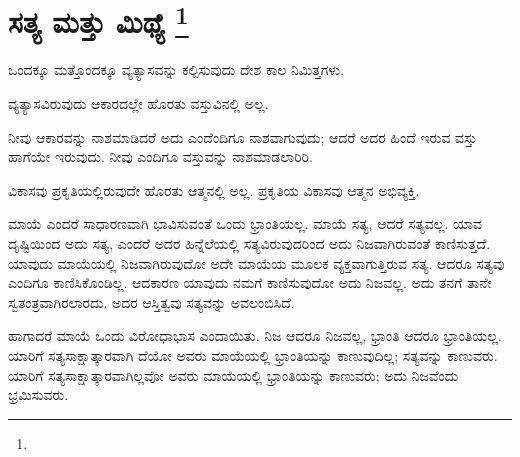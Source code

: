 
\chapter[ಸತ್ಯ ಮತ್ತು ಮಿಥ್ಯೆ ]{ಸತ್ಯ ಮತ್ತು ಮಿಥ್ಯೆ \protect\footnote{}}

ಒಂದಕ್ಕೂ ಮತ್ತೊಂದಕ್ಕೂ ವ್ಯತ್ಯಾಸವನ್ನು ಕಲ್ಪಿಸುವುದು ದೇಶ ಕಾಲ ನಿಮಿತ್ತಗಳು.

ವ್ಯತ್ಯಾಸವಿರುವುದು ಆಕಾರದಲ್ಲೇ ಹೊರತು ವಸ್ತುವಿನಲ್ಲಿ ಅಲ್ಲ.

ನೀವು ಆಕಾರವನ್ನು ನಾಶಮಾಡಿದರೆ ಅದು ಎಂದೆಂದಿಗೂ ನಾಶವಾಗುವುದು; ಆದರೆ ಅದರ ಹಿಂದೆ ಇರುವ ವಸ್ತು ಹಾಗೆಯೇ ಇರುವುದು. ನೀವು ಎಂದಿಗೂ ವಸ್ತುವನ್ನು ನಾಶಮಾಡಲಾರಿರಿ.

ವಿಕಾಸವು ಪ್ರಕೃತಿಯಲ್ಲಿರುವುದೇ ಹೊರತು ಆತ್ಮನಲ್ಲಿ ಅಲ್ಲ. ಪ್ರಕೃತಿಯ ವಿಕಾಸವು ಆತ್ಮನ ಅಭಿವ್ಯಕ್ತಿ.

ಮಾಯೆ ಎಂದರೆ ಸಾಧಾರಣವಾಗಿ ಭಾವಿಸುವಂತೆ ಒಂದು ಭ್ರಾಂತಿಯಲ್ಲ. ಮಾಯೆ ಸತ್ಯ, ಆದರೆ ಸತ್ಯವಲ್ಲ. ಯಾವ ದೃಷ್ಟಿಯಿಂದ ಅದು ಸತ್ಯ, ಎಂದರೆ ಅದರ ಹಿನ್ನೆಲೆಯಲ್ಲಿ ಸತ್ಯವಿರುವುದರಿಂದ ಅದು ನಿಜವಾಗಿರುವಂತೆ ಕಾಣಿಸುತ್ತದೆ. ಯಾವುದು ಮಾಯೆಯಲ್ಲಿ ನಿಜವಾಗಿರುವುದೋ ಅದೇ ಮಾಯೆಯ ಮೂಲಕ ವ್ಯಕ್ತವಾಗುತ್ತಿರುವ ಸತ್ಯ. ಆದರೂ ಸತ್ಯವು ಎಂದಿಗೂ ಕಾಣಿಸಿಕೊಂಡಿಲ್ಲ. ಆದಕಾರಣ ಯಾವುದು ನಮಗೆ ಕಾಣಿಸುವುದೋ ಅದು ನಿಜವಲ್ಲ. ಅದು ತನಗೆ ತಾನೇ ಸ್ವತಂತ್ರವಾಗಿರಲಾರದು. ಅದರ ಆಸ್ತಿತ್ವವು ಸತ್ಯವನ್ನು ಅವಲಂಬಿಸಿದೆ.

ಹಾಗಾದರೆ ಮಾಯೆ ಒಂದು ವಿರೋಧಾಭಾಸ ಎಂದಾಯಿತು. ನಿಜ ಆದರೂ ನಿಜವಲ್ಲ, ಭ್ರಾಂತಿ ಆದರೂ ಭ್ರಾಂತಿಯಲ್ಲ. ಯಾರಿಗೆ ಸತ್ಯಸಾಕ್ಷಾತ್ಕಾರವಾಗಿ ದೆಯೋ ಅವರು ಮಾಯೆಯಲ್ಲಿ ಭ್ರಾಂತಿಯನ್ನು ಕಾಣುವುದಿಲ್ಲ; ಸತ್ಯವನ್ನು ಕಾಣುವರು. ಯಾರಿಗೆ ಸತ್ಯಸಾಕ್ಷಾತ್ಕಾರವಾಗಿಲ್ಲವೋ ಅವರು ಮಾಯೆಯಲ್ಲಿ ಭ್ರಾಂತಿಯನ್ನು ಕಾಣುವರು; ಅದು ನಿಜವೆಂದು ಭ್ರಮಿಸುವರು.

